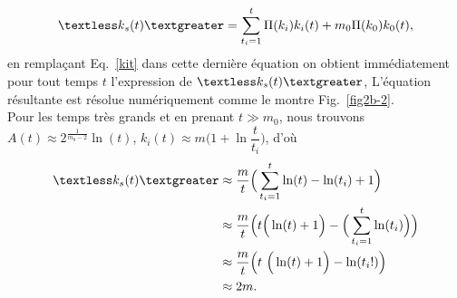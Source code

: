 \begin{eqnarray}
\kms=\sum_{t_i=1}^t\Pi(k_i)k_i(t)+m_0\Pi(k_0)k_0(t),
\label{kms-2}
\end{eqnarray}
 en remplaçant Eq.~\ref{kit} dans cette dernière équation on obtient immédiatement pour tout temps $ t $ l'expression de $\kms$, L'équation résultante est résolue numériquement comme le montre Fig.~\ref{fig2b-2}. \\
Pour les temps très grands et en prenant $t \gg m_0$, nous trouvons 
$A(t)\approx 2^{\frac{1}{m_0-2}} \ln(t)$, $k_i(t)\approx m\Big(1+\ln \dfrac{t}{t_i}\Big)$, d'où
\begin{align}
\label{kom}
\kms&\approx\dfrac{m}{t}\Big(\sum_{t_i=1}^{t} \ln(t)-\ln(t_i)+1\Big)\\
&\approx\dfrac{m}{t}\Big(t \Big(\ln(t)+1\Big)-\Big(\sum_{t_i=1}^{t} \ln(t_i)\Big)\Big) \nonumber \\
&\approx\dfrac{m}{t}\Big(t\ \Big(\ln(t)+1\Big)-\ln(t_i!)\Big) \nonumber \\
&\approx2m. \nonumber
\end{align}

